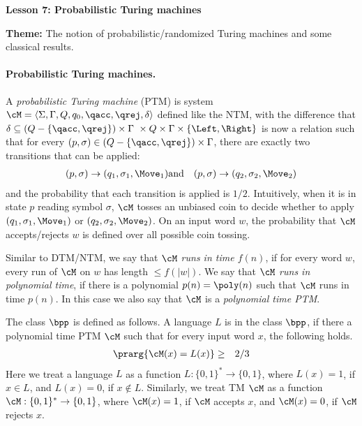 \documentclass[11pt, a4paper]{article}
\renewcommand{\lesson}{7}
\renewcommand{\lessontitle}{Probabilistic Turing machines}
\renewcommand{\fulltitle}{Lesson \lesson: \lessontitle}
\begin{document}
\date{}



\begin{center}
{\Large {\bf \fulltitle}}
\end{center}
\vspace{0.5cm}

\noindent
{\bf Theme:} The notion of probabilistic/randomized Turing machines and some classical results.

\paragraph*{Probabilistic Turing machines.}
A {\em probabilistic Turing machine} (PTM) is system $\cM = \langle \Sigma,\Gamma,Q,q_0,\qacc,\qrej,\delta\rangle$
defined like the NTM,
with the difference that $\delta\subseteq (Q-\{\qacc,\qrej\})\times\Gamma \ \times Q\times \Gamma\times \{\Left,\Right\}$ 
is now a relation such that for every $(p,\sigma)\in (Q-\{\qacc,\qrej\})\times\Gamma$,
there are exactly two transitions that can be applied:
\begin{eqnarray*}
(p,\sigma)\to (q_1,\sigma_1,\Move_1) & \text{and} &
(p,\sigma)\to (q_2,\sigma_2,\Move_2)
\end{eqnarray*}
and the probability that each transition is applied is $1/2$.
Intuitively, when it is in state $p$ reading symbol $\sigma$,
$\cM$ tosses an unbiased coin to decide whether to apply $(q_1,\sigma_1,\Move_1)$ or $(q_2,\sigma_2,\Move_2)$.
On an input word $w$, the probability that $\cM$ accepts/rejects $w$ is defined
over all possible coin tossing.

Similar to DTM/NTM, we say that {\em $\cM$ runs in time $f(n)$}, if
for every word $w$, every run of $\cM$ on $w$ has length $\leq f(|w|)$.
We say that {\em $\cM$ runs in polynomial time}, if there is a polynomial $p(n)=\poly(n)$
such that $\cM$ runs in time $p(n)$.
In this case we also say that $\cM$ is a {\em polynomial time PTM}.

The class $\bpp$ is defined as follows.
A language $L$ is in the class $\bpp$, if there a polynomial time PTM $\cM$ such that
for every input word $x$, the following holds.
\begin{eqnarray*}
\prarg { \cM(x) = L(x) } & \geq & 2/3
\end{eqnarray*}
Here we treat a language $L$ as a function $L:\{0,1\}^*\to \{0,1\}$,
where $L(x)=1$, if $x\in L$,
and $L(x)=0$, if $x\notin L$. 
Similarly, we treat TM $\cM$ as a function $\cM:\{0,1\}^*\to \{0,1\}$,
where $\cM(x)=1$, if $\cM$ accepts $x$,
and $\cM(x)=0$, if $\cM$ rejects $x$.
\end{document}
